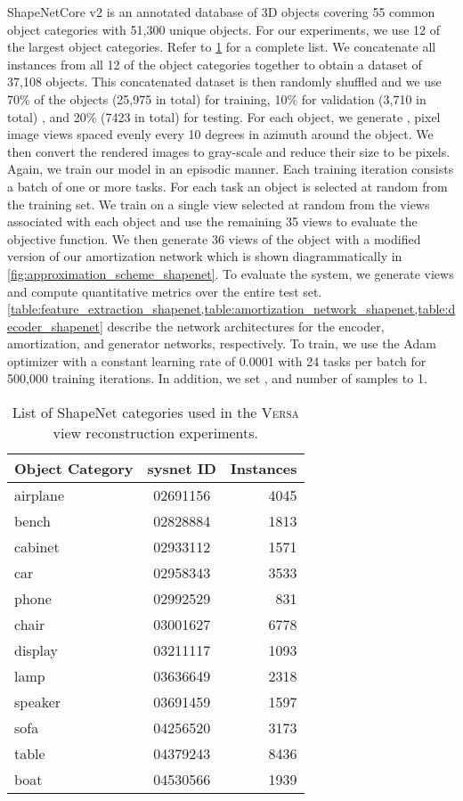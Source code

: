 \documentclass{article}
\newcommand{\Versa}{\textsc{Versa}}
\begin{document}
ShapeNetCore v2 \citep{shapenet2015} is an annotated database of 3D objects covering 55 common object categories with 51,300 unique objects. For our experiments, we use 12 of the largest object categories. Refer to \cref{table:shapenet_categories} for a complete list. We concatenate all instances from all 12 of the object categories together to obtain a dataset of 37,108 objects. This concatenated dataset is then randomly shuffled and we use 70\% of the objects (25,975 in total) for training, 10\% for validation (3,710 in total) , and 20\% (7423 in total) for testing. For each object, we generate ,  pixel image views spaced evenly every 10 degrees in azimuth around the object. We then convert the rendered images to gray-scale and reduce their size to be  pixels. Again, we train our model in an episodic manner. Each training iteration consists a batch of one or more tasks. For each task an object is selected at random from the training set. We train on a single view selected at random from the  views associated with each object and use the remaining 35 views to evaluate the objective function. We then generate 36 views of the object with a modified version of our amortization network which is shown diagrammatically in \cref{fig:approximation_scheme_shapenet}. To evaluate the system, we generate views and compute quantitative metrics over the entire test set. \cref{table:feature_extraction_shapenet,table:amortization_network_shapenet,table:decoder_shapenet} describe the network architectures for the encoder, amortization, and generator networks, respectively. To train, we use the Adam \citep{kingma2014adam} optimizer with a constant learning rate of 0.0001 with 24 tasks per batch for 500,000 training iterations. In addition, we set ,  and number of  samples to 1.

\begin{table}[!h]
    \caption{List of ShapeNet categories used in the \Versa{} view reconstruction experiments.}
	\centering
	\begin{tabular}{lcr}
		\toprule
		\textbf{Object Category} & \textbf{sysnet ID} & \textbf{Instances} \\
        \midrule
        airplane & 02691156 & 4045 \\
        bench    & 02828884 & 1813 \\
        cabinet  & 02933112 & 1571 \\
        car      & 02958343 & 3533 \\
        phone    & 02992529 & 831  \\
        chair    & 03001627 & 6778 \\
        display  & 03211117 & 1093 \\
        lamp     & 03636649 & 2318 \\
        speaker  & 03691459 & 1597 \\
        sofa     & 04256520 & 3173 \\
        table    & 04379243 & 8436 \\
        boat     & 04530566 & 1939 \\
        \bottomrule
	\end{tabular}
    \vspace{2mm}
	\label{table:shapenet_categories}
\end{table}
\end{document}
